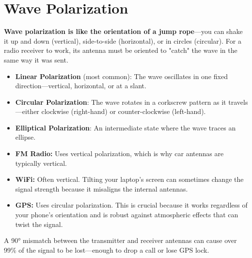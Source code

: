 
\chapter{Wave Polarization}
\label{ch:polarization}

\begin{nontechnical}
    \textbf{Wave polarization is like the orientation of a jump rope}---you can shake it up and down (vertical), side-to-side (horizontal), or in circles (circular). For a radio receiver to work, its antenna must be oriented to "catch" the wave in the same way it was sent.

    \begin{itemize}
        \item \textbf{Linear Polarization} (most common): The wave oscillates in one fixed direction---vertical, horizontal, or at a slant.
        \item \textbf{Circular Polarization}: The wave rotates in a corkscrew pattern as it travels---either clockwise (right-hand) or counter-clockwise (left-hand).
        \item \textbf{Elliptical Polarization}: An intermediate state where the wave traces an ellipse.
    \end{itemize}

    \begin{itemize}
        \item \textbf{FM Radio:} Uses vertical polarization, which is why car antennas are typically vertical.
        \item \textbf{WiFi:} Often vertical. Tilting your laptop's screen can sometimes change the signal strength because it misaligns the internal antennas.
        \item \textbf{GPS:} Uses circular polarization. This is crucial because it works regardless of your phone's orientation and is robust against atmospheric effects that can twist the signal.
    \end{itemize}

     A 90° mismatch between the transmitter and receiver antennas can cause over 99\% of the signal to be lost---enough to drop a call or lose GPS lock.
\end{nontechnical}


